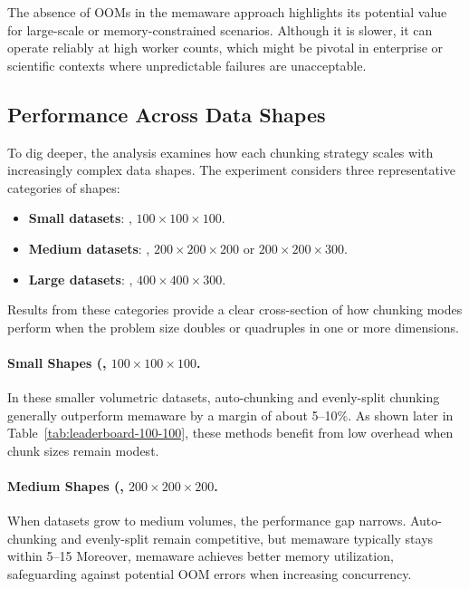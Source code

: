The absence of \ac{OOM}s in the memaware approach highlights its potential value for large-scale or memory-constrained scenarios.
Although it is slower, it can operate reliably at high worker counts, which might be pivotal in enterprise or scientific contexts where unpredictable failures are unacceptable.

\subsection{Performance Across Data Shapes}
\label{subsec:per-shape-performance}

To dig deeper, the analysis examines how each chunking strategy scales with increasingly complex data shapes.
The experiment considers three representative categories of shapes:
\begin{itemize}
    \item \textbf{Small datasets}: \eg, \(100 \times 100 \times 100\).
    \item \textbf{Medium datasets}: \eg, \(200 \times 200 \times 200\) or \(200 \times 200 \times 300\).
    \item \textbf{Large datasets}: \eg, \(400 \times 400 \times 300\).
\end{itemize}
Results from these categories provide a clear cross-section of how chunking modes perform when the problem size doubles or quadruples in one or more dimensions.

\paragraph{Small Shapes (\eg, \(100 \times 100 \times 100\).}
In these smaller volumetric datasets, auto-chunking and evenly-split chunking generally outperform memaware by a margin of about 5--10\%.
As shown later in Table~\ref{tab:leaderboard-100-100}, these methods benefit from low overhead when chunk sizes remain modest.

\paragraph{Medium Shapes (\eg, \(200 \times 200 \times 200\).}
When datasets grow to medium volumes, the performance gap narrows.
Auto-chunking and evenly-split remain competitive, but memaware typically stays within 5–15%
Moreover, memaware achieves better memory utilization, safeguarding against potential \ac{OOM} errors when increasing concurrency.


